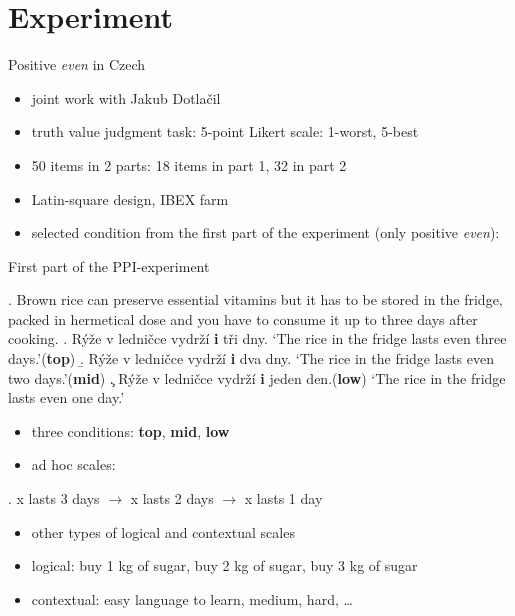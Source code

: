 \documentclass[ignorenonframetext,]{beamer}
\providecommand{\tightlist}{%
  \setlength{\itemsep}{0pt}\setlength{\parskip}{0pt}}
\newcommand{\cond}[1]{\textbf{#1}}
\begin{document}
\section{Experiment}\label{experiment}

\begin{frame}{Positive \emph{even} in Czech}

\begin{itemize}
\tightlist
\item
  joint work with Jakub Dotlačil 
\item
  truth value judgment task: 5-point Likert scale: 1-worst, 5-best
\item
  50 items in 2 parts: 18 items in part 1, 32 in part 2
\item
  Latin-square design, IBEX farm
\item
  selected condition from the first part of the experiment (only
  positive \emph{even}):
\end{itemize}

\end{frame}

\begin{frame}{First part of the PPI-experiment}

\ex. Brown rice can preserve essential vitamins but it has to be stored
in the fridge, packed in hermetical dose and you have to consume it up
to three days after cooking.\label{ex-1} \a. Rýže v ledničce vydrží
\textbf{i} tři dny. \label{ex-1-a}\newline
`The rice in the fridge lasts even three days.'\hfill (\cond{top}) \b.
Rýže v ledničce vydrží \textbf{i} dva dny.\label{ex-1-b}\newline
`The rice in the fridge lasts even two days.'\hfill (\cond{mid}) \c.
Rýže v ledničce vydrží \textbf{i} jeden
den.\hfill (\cond{low})\label{ex-1-c}\newline
`The rice in the fridge lasts even one day.'

\end{frame}

\begin{frame}

\begin{itemize}
\tightlist
\item
  three conditions: \textbf{top}, \textbf{mid}, \textbf{low}
\item
  ad hoc scales:
\end{itemize}

\ex. x lasts 3 days \(\rightarrow\) x lasts 2 days \(\rightarrow\) x
lasts 1 day

\begin{itemize}
\tightlist
\item
  other types of logical and contextual scales
\item
  logical: buy 1 kg of sugar, buy 2 kg of sugar, buy 3 kg of sugar
\item
  contextual: easy language to learn, medium, hard, \ldots
\end{itemize}

\end{frame}
\end{document}
